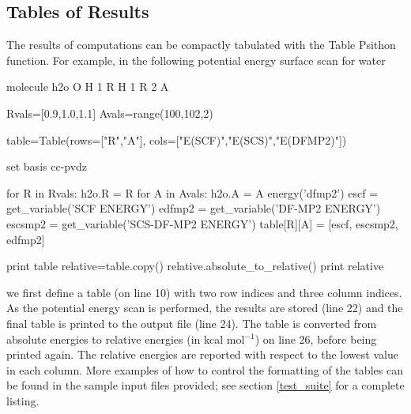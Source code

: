 \subsection{Tables of Results}
The results of computations can be compactly tabulated with the Table Psithon
function. For example, in the following potential energy surface scan for water
\begin{Snippet}
molecule h2o {
  O
  H 1 R
  H 1 R 2 A
}

Rvals=[0.9,1.0,1.1]
Avals=range(100,102,2)

table=Table(rows=["R","A"], cols=["E(SCF)","E(SCS)","E(DFMP2)"])

set basis cc-pvdz

for R in Rvals:
    h2o.R = R
    for A in Avals:
        h2o.A = A
        energy('dfmp2')
        escf = get_variable('SCF ENERGY')
        edfmp2 = get_variable('DF-MP2 ENERGY')
        escsmp2 = get_variable('SCS-DF-MP2 ENERGY')
        table[R][A] = [escf, escsmp2, edfmp2]

print table
relative=table.copy()
relative.absolute_to_relative()
print relative
\end{Snippet}
we first define a table (on line 10) with two row indices and three column
indices. As the potential energy scan is performed, the results are stored
(line 22) and the final table is printed to the output file (line 24). The
table is converted from absolute energies to relative energies (in kcal mol$^{-1}$)
on line 26, before being printed again. The relative energies are reported with
respect to the lowest value in each column. More examples of how to control the
formatting of the tables can be found in the sample input files provided; see
section \ref{test_suite} for a complete listing.
